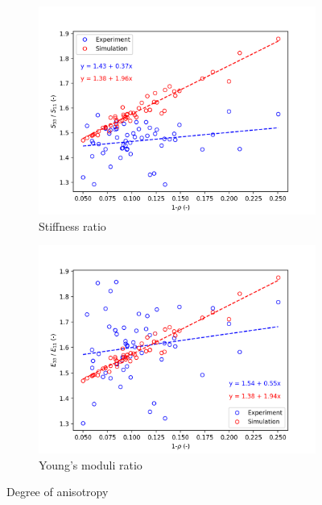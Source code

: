 \documentclass[a4paper,fleqn]{DC_ArtStyle}
\begin{document}
	\begin{figure}
		\centering
		\begin{subfigure}[b]{0.45\linewidth}
			\includegraphics[width=\linewidth]{../_Results/ExpSim_AniS}
			\caption{Stiffness ratio}
		\end{subfigure}
		\begin{subfigure}[b]{0.45\linewidth}
			\includegraphics[width=\linewidth]{../_Results/ExpSim_AniE}
			\caption{Young's moduli ratio}
		\end{subfigure}
		\caption{Degree of anisotropy}
	\end{figure}

	
\end{document}
